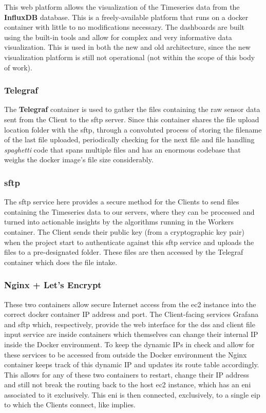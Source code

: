 This web platform allows the visualization of the Timeseries data from the \textbf{InfluxDB} database. This is a freely-available platform that runs on a docker container with little to no modifications necessary. The dashboards are built using the built-in tools and allow for complex and very informative data visualization. This is used in both the new and old architecture, since the new visualization platform is still not operational (not within the scope of this body of work).

\subsubsection{Telegraf}\label{methodology:sss:telegraf}

The \textbf{Telegraf} container is used to gather the files containing the raw sensor data sent from the Client to the \gls{sftp} server. Since this container shares the file upload location folder with the \gls{sftp}, through a convoluted process of storing the filename of the last file uploaded, periodically checking for the next file and file handling \textit{spaghetti} code that spans multiple files and has an enormous codebase that weighs the docker image's file size considerably. 

\subsubsection{\gls{sftp}}\label{methodology:sss:sftp}

The \gls{sftp} service here provides a secure method for the Clients to send files containing the Timeseries data to our servers, where they can be processed and turned into actionable insights by the algorithms running in the Workers container. The Client sends their public key (from a cryptographic key pair) when the project start to authenticate against this \gls{sftp} service and uploads the files to a pre-designated folder. These files are then accessed by the Telegraf container which does the file intake.


\subsubsection{Nginx + Let's Encrypt}\label{methodology:sss:nginxletsencrypt}

These two containers allow secure Internet access from the \gls{ec2} instance into the correct docker container IP address and port. The Client-facing services Grafana and \gls{sftp} which, respectively, provide the web interface for the \gls{dss} and client file input service are inside containers which themselves can change their internal IP inside the Docker environment. To keep the dynamic IPs in check and allow for these services to be accessed from outside the Docker environment the Nginx container keeps track of this dynamic IP and updates its route table accordingly. This allows for any of these two containers to restart, change their IP address and still not break the routing back to the host \gls{ec2} instance, which has an \gls{eni} associated to it exclusively. This \gls{eni} is then connected, exclusively, to a single \gls{eip} to which the Clients connect, like  implies.

